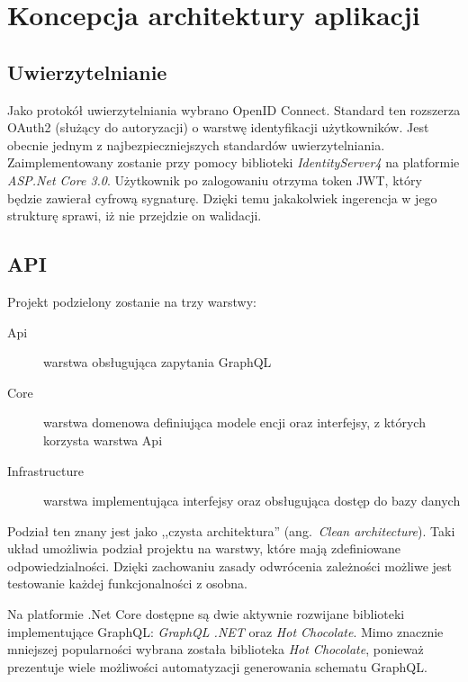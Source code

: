 \section{Koncepcja architektury aplikacji}
	\subsection{Uwierzytelnianie}
		Jako protokół uwierzytelniania wybrano OpenID Connect.
		Standard ten rozszerza OAuth2 (służący do autoryzacji) o warstwę identyfikacji użytkowników.
		Jest obecnie jednym z najbezpieczniejszych standardów uwierzytelniania.
		Zaimplementowany zostanie przy pomocy biblioteki \emph{IdentityServer4} na platformie \emph{ASP.Net Core 3.0}.
		Użytkownik po zalogowaniu otrzyma token JWT, który będzie zawierał cyfrową sygnaturę.
		Dzięki temu jakakolwiek ingerencja w jego strukturę sprawi, iż nie przejdzie on walidacji.


	\subsection{API}
		Projekt podzielony zostanie na trzy warstwy:
		\begin{description}
			\item[Api] warstwa obsługująca zapytania GraphQL
			\item[Core] warstwa domenowa definiująca modele encji oraz interfejsy, z których korzysta warstwa Api
			\item[Infrastructure] warstwa implementująca interfejsy oraz obsługująca dostęp do bazy danych
		\end{description}
		Podział ten znany jest jako ,,czysta architektura'' (ang.\ \emph{Clean architecture}).
		Taki układ umożliwia podział projektu na warstwy, które mają zdefiniowane odpowiedzialności.
		Dzięki zachowaniu zasady odwrócenia zależności możliwe jest testowanie każdej funkcjonalności z osobna.

		Na platformie \@.Net Core dostępne są dwie aktywnie rozwijane biblioteki implementujące GraphQL\@: \emph{GraphQL \@.NET} oraz \emph{Hot Chocolate}.
		Mimo znacznie mniejszej popularności wybrana została biblioteka \emph{Hot Chocolate},
		ponieważ prezentuje wiele możliwości automatyzacji generowania schematu GraphQL\@.


